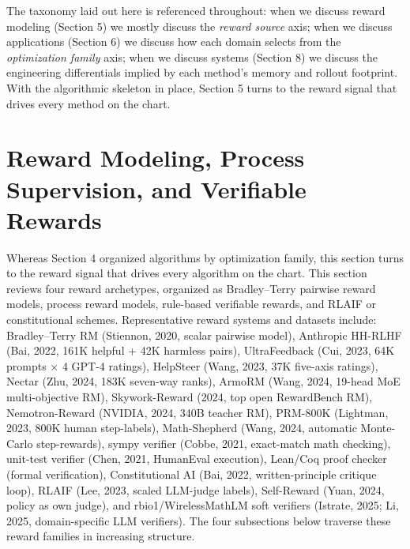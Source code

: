 The taxonomy laid out here is referenced throughout: when we discuss reward modeling (Section 5) we mostly discuss the \emph{reward source} axis; when we discuss applications (Section 6) we discuss how each domain selects from the \emph{optimization family} axis; when we discuss systems (Section 8) we discuss the engineering differentials implied by each method's memory and rollout footprint. With the algorithmic skeleton in place, Section 5 turns to the reward signal that drives every method on the chart.

\section{Reward Modeling, Process Supervision, and Verifiable Rewards}\label{reward-modeling-process-supervision-and-verifiable-rewards}

Whereas Section 4 organized algorithms by optimization family, this section turns to the reward signal that drives every algorithm on the chart. This section reviews four reward archetypes, organized as Bradley--Terry pairwise reward models, process reward models, rule-based verifiable rewards, and RLAIF or constitutional schemes. Representative reward systems and datasets include: Bradley--Terry RM (Stiennon, 2020, scalar pairwise model), Anthropic HH-RLHF (Bai, 2022, 161K helpful + 42K harmless pairs), UltraFeedback (Cui, 2023, 64K prompts × 4 GPT-4 ratings), HelpSteer (Wang, 2023, 37K five-axis ratings), Nectar (Zhu, 2024, 183K seven-way ranks), ArmoRM (Wang, 2024, 19-head MoE multi-objective RM), Skywork-Reward (2024, top open RewardBench RM), Nemotron-Reward (NVIDIA, 2024, 340B teacher RM), PRM-800K (Lightman, 2023, 800K human step-labels), Math-Shepherd (Wang, 2024, automatic Monte-Carlo step-rewards), sympy verifier (Cobbe, 2021, exact-match math checking), unit-test verifier (Chen, 2021, HumanEval execution), Lean/Coq proof checker (formal verification), Constitutional AI (Bai, 2022, written-principle critique loop), RLAIF (Lee, 2023, scaled LLM-judge labels), Self-Reward (Yuan, 2024, policy as own judge), and rbio1/WirelessMathLM soft verifiers (Istrate, 2025; Li, 2025, domain-specific LLM verifiers). The four subsections below traverse these reward families in increasing structure.

